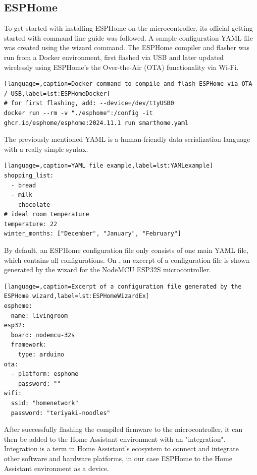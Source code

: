 \subsection{ESPHome}

To get started with installing ESPHome on the microcontroller, its official getting started with command line guide was followed. \cite{ESPHomeGettingStarted} A sample configuration YAML file was created using the wizard command. The ESPHome compiler and flasher was run from a Docker environment, first flashed via USB and later updated wirelessly using ESPHome's the Over-the-Air (OTA) functionality via Wi-Fi.

\begin{lstlisting}[language=,caption=Docker command to compile and flash ESPHome via OTA / USB,label=lst:ESPHomeDocker]
# for first flashing, add: --device=/dev/ttyUSB0
docker run --rm -v "./esphome":/config -it ghcr.io/esphome/esphome:2024.11.1 run smarthome.yaml
\end{lstlisting}

The previously mentioned YAML is a human-friendly data serialization language with a really simple syntax. \cite{YAMLHomepage}

\begin{lstlisting}[language=,caption=YAML file example,label=lst:YAMLexample]
shopping_list:
  - bread
  - milk
  - chocolate
# ideal room temperature
temperature: 22
winter_months: ["December", "January", "February"]
\end{lstlisting}

By default, an ESPHome configuration file only consists of one main YAML file, which contains all configurations. On , an excerpt of a configuration file is shown generated by the wizard for the NodeMCU ESP32S microcontroller.

\begin{lstlisting}[language=,caption=Excerpt of a configuration file generated by the ESPHome wizard,label=lst:ESPHomeWizardEx]
esphome:
  name: livingroom
esp32:
  board: nodemcu-32s
  framework:
    type: arduino
ota:
  - platform: esphome
    password: ""
wifi:
  ssid: "homenetwork"
  password: "teriyaki-noodles"
\end{lstlisting}

After successfully flashing the compiled firmware to the microcontroller, it can then be added to the Home Assistant environment with an "integration". Integration is a term in Home Assistant's ecosystem to connect and integrate other software and hardware platforms, in our case ESPHome to the Home Assistant environment as a device. \cite{HAConceptsTerminology}

